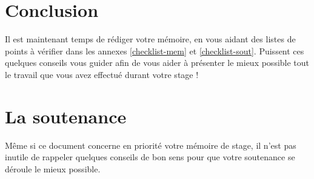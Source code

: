 \documentclass [twoside,openright,a4paper,11pt,french] {report}
\begin{document}

\chapter {Conclusion}
    \label {chap:conc}

Il est maintenant temps de rédiger votre mémoire, en vous aidant des
listes de points à vérifier dans les annexes \ref{checklist-mem} et
\ref{checklist-sout}. Puissent ces quelques
conseils vous guider afin de vous aider à présenter le mieux possible
tout le travail que vous avez effectué durant votre stage !



\appendix
\chapter {La soutenance}

Même si ce document concerne en priorité votre mémoire de stage,
il n'est pas inutile de rappeler quelques conseils de bon sens
pour que votre soutenance se déroule le mieux possible.
\end{document}
